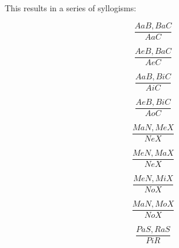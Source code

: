 \documentclass{article}
\begin{document}
This results in a series of syllogisms:

\begin{center}
	\begin{minipage}{0.3\linewidth}
	\begin{equation}
		\frac{AaB,BaC}{AaC}
	\end{equation}
	\end{minipage}
	\begin{minipage}{0.3\linewidth}
	\begin{equation}
		\frac{AeB,BaC}{AeC}
	\end{equation}
	\end{minipage}
	\begin{minipage}{0.3\linewidth}
	\begin{equation}
		\frac{AaB,BiC}{AiC}
	\end{equation}
	\end{minipage}
\end{center}

\begin{center}
	\begin{minipage}{0.3\linewidth}
	\begin{equation}
		\frac{AeB,BiC}{AoC}
	\end{equation}
	\end{minipage}
	\begin{minipage}{0.3\linewidth}
	\begin{equation}
		\frac{MaN,MeX}{NeX}
	\end{equation}
	\end{minipage}
	\begin{minipage}{0.3\linewidth}
	\begin{equation}
		\frac{MeN,MaX}{NeX}
	\end{equation}
	\end{minipage}
\end{center}

\begin{center}
	\begin{minipage}{0.3\linewidth}
	\begin{equation}
		\frac{MeN,MiX}{NoX}
	\end{equation}
	\end{minipage}
	\begin{minipage}{0.3\linewidth}
	\begin{equation}
		\frac{MaN,MoX}{NoX}
	\end{equation}
	\end{minipage}
	\begin{minipage}{0.3\linewidth}
	\begin{equation}
		\frac{PaS,RaS}{PiR}
	\end{equation}
	\end{minipage}
\end{center}
\end{document}
